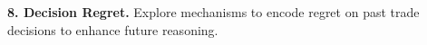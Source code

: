 \documentclass{article}
\begin{document}
\textbf{8. Decision Regret.}
Explore mechanisms to encode regret on past trade decisions to enhance future reasoning.









\end{document}
